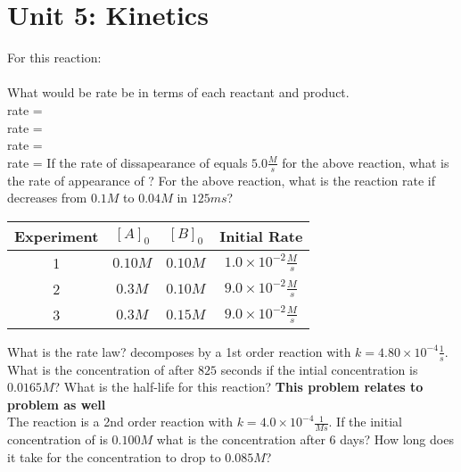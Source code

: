 \documentclass[../main.tex]{subfiles}
\begin{document}
\section{Unit 5: Kinetics}
\ProblemSet
For this reaction: \\
 \\
What would be rate be in terms of each reactant and product. \\
 \hspace{0.5em} rate = \\
 \hspace{0.5em} rate = \\
 \hspace{0.5em} rate = \\
 \hspace{0.5em} rate = 
\ProblemSet
If the rate of dissapearance of  equals \(5.0\frac{M}{s}\) for the above reaction, what is the rate of appearance of ?
\ProblemSet
For the above reaction, what is the reaction rate if  decreases from \(0.1M\) to \(0.04M\) in \(125ms\)?
\ProblemSet
{}
\begin{center}
    \begin{tabular}{||c c c c||} 
     \hline
     Experiment & \([A]_0\) & \([B]_0\) & Initial Rate \\ [0.5ex] 
     \hline\hline
     1 & \(0.10M\) & \(0.10M\) & \(1.0 \times 10^{-2}\frac{M}{s}\) \\ [1ex]
     \hline
     2 & \(0.3M\) & \(0.10M\) & \(9.0 \times 10^{-2}\frac{M}{s}\) \\[1ex]
     \hline
     3 & \(0.3M\) & \(0.15M\) & \(9.0 \times 10^{-2} \frac{M}{s}\) \\ [1ex] 
     \hline
    \end{tabular}
\end{center}
What is the rate law?
\ProblemSet
{} decomposes by a 1st order reaction with \(k = 4.80 \times 10^{-4} \frac{1}{s}\). What is the concentration of  after \(825\) seconds if the 
intial concentration is \(0.0165M\)? What is the half-life for this reaction?
\ProblemSet
\textbf{This problem relates to problem \theyayCounter{} as well }\\
The reaction  is a 2nd order reaction with \(k = 4.0 \times 10^{-4}\frac{1}{Ms}\). If the initial concentration of  is
\(0.100M\) what is the concentration after 6 days?
\ProblemSet
How long does it take for the concentration to drop to \(0.085M\)?
\end{document}
